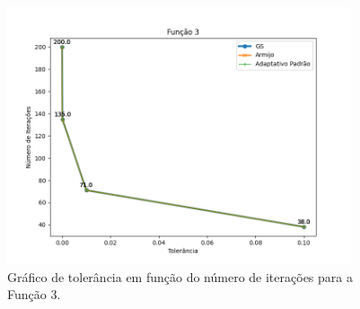 \documentclass{article}
\begin{document}
\begin{figure}[h]
  \centering
  \includegraphics[width=0.9\textwidth]{funcao_3_otimizacao.png}
  \caption{Gráfico de tolerância em função do número de iterações para a Função 3.}
  \label{fig:graf_funcao3}
\end{figure}




\end{document}
